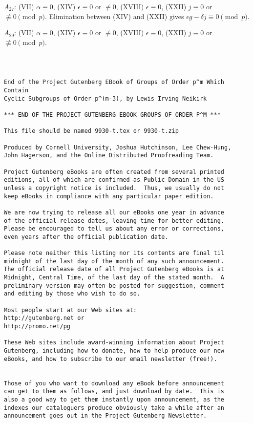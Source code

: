 \documentclass[oneside]{article}
\begin{document}
\smallskip
$A_{27}$: (VII) $\alpha \equiv 0$, (XIV) $\epsilon \equiv 0$ or
$\not\equiv 0$, (XVIII) $\epsilon \equiv 0$, (XXII) $j \equiv 0$ or
$\not\equiv 0 \pmod{p}$. Elimination between (XIV) and (XXII) gives
$\epsilon g - \delta j \equiv 0 \pmod{p}$.

\smallskip
$A_{29}$: (VII) $\alpha \equiv 0$, (XIV) $\epsilon \equiv 0$ or
$\not\equiv 0$, (XVIII) $\epsilon \equiv 0$, (XXII) $j \equiv 0$ or
$\not\equiv 0 \pmod{p}$.



\newpage
\small
{}
\begin{verbatim}



End of the Project Gutenberg EBook of Groups of Order p^m Which Contain
Cyclic Subgroups of Order p^(m-3), by Lewis Irving Neikirk

*** END OF THE PROJECT GUTENBERG EBOOK GROUPS OF ORDER P^M ***

This file should be named 9930-t.tex or 9930-t.zip

Produced by Cornell University, Joshua Hutchinson, Lee Chew-Hung,
John Hagerson, and the Online Distributed Proofreading Team.

Project Gutenberg eBooks are often created from several printed
editions, all of which are confirmed as Public Domain in the US
unless a copyright notice is included.  Thus, we usually do not
keep eBooks in compliance with any particular paper edition.

We are now trying to release all our eBooks one year in advance
of the official release dates, leaving time for better editing.
Please be encouraged to tell us about any error or corrections,
even years after the official publication date.

Please note neither this listing nor its contents are final til
midnight of the last day of the month of any such announcement.
The official release date of all Project Gutenberg eBooks is at
Midnight, Central Time, of the last day of the stated month.  A
preliminary version may often be posted for suggestion, comment
and editing by those who wish to do so.

Most people start at our Web sites at:
http://gutenberg.net or
http://promo.net/pg

These Web sites include award-winning information about Project
Gutenberg, including how to donate, how to help produce our new
eBooks, and how to subscribe to our email newsletter (free!).


Those of you who want to download any eBook before announcement
can get to them as follows, and just download by date.  This is
also a good way to get them instantly upon announcement, as the
indexes our cataloguers produce obviously take a while after an
announcement goes out in the Project Gutenberg Newsletter.


\end{verbatim}
\end{document}
